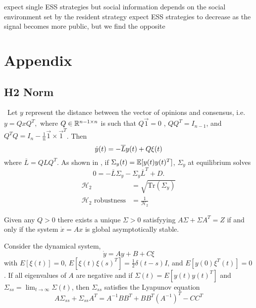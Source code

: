 \documentclass{article}
\newcommand{\Tr}{\text{Tr}}
\begin{document}
expect single ESS strategies but social information depends on the social environment set by the resident strategy
expect ESS strategies to decrease as the signal becomes more public, but we find the opposite

\newpage
\section{Appendix}
\subsection{H2 Norm \label{H2}} 

\ Let $y$ represent the distance between the vector of opinions and consensus, i.e.
$y=QxQ^T,$
where $Q\in{\mathbb{R}}^{n-1\times n}$ is such that $Q\vec{1}=0$ , $QQ^T=I_{n-1}$, and $Q^TQ=I_n-\frac{1}{n}\vec{1}\times\vec{1}^T$.   
Then 
\begin{equation}
\dot{y}(t)=-\overline{L}y(t)+Q\xi(t) \notag
\end{equation}
where $\overline{L}=QLQ^T$.  As shown in \cite{Young:2010fk}, if $\Sigma_y(t)={\mathbb{E}}[y(t)y(t)^T]$,  $\Sigma_y$ at equilibrium solves
\begin{equation} 0=-\overline{L}\Sigma_y-\Sigma_y\overline{L}^T+D. \label{h2norm}
\end{equation}
\begin{align*}
\mathscr{H}_2&=\sqrt{\Tr(\Sigma_y)}
\\\mathscr{H}_2 \text{ robustness} &=\frac{1}{\mathscr{H}_2}
\end{align*}

\begin{claim}
Given any $Q>0$ there exists a unique $\Sigma>0$ satisfyying $A\Sigma+\Sigma A^T=Z$ if and only if the system $\dot{x}=Ax$ is  global asymptotically stable.
\end{claim}

\begin{claim}
Consider the dynamical system,
\begin{equation}
\dot{y}=Ay+B+C\xi  \label{tofindsigma}
\end{equation}
with $E[\xi(t)]=0$, $E[\xi(t)\xi(s)^T]=\frac{1}{2}\delta(t-s)I$, and $E[y(0)\xi^T(t)]=0$. If all eigenvalues of $A$ are negative and if $\Sigma(t)=E[y(t)y(t)^T]$ and $\Sigma_{ss}=\lim_{t\to\infty}\Sigma(t)$, then $\Sigma_{ss}$ satisfies the Lyapunov equation
\begin{equation*}
A\Sigma_{ss}+\Sigma_{ss}A^T=A^{-1}BB^T+BB^T(A^{-1})^T-CC^T
\end{equation*}
\end{claim}
\end{document}
